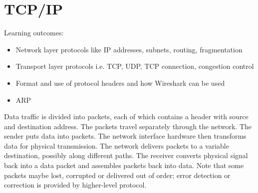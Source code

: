 \documentclass[twoside]{article}
\begin{document}
\section{TCP/IP}
Learning outcomes:
\begin{itemize}
    \item Network layer protocols like IP addresses, subnets, routing,
    fragmentation
    \item Transport layer protocols i.e. TCP, UDP, TCP connection, congestion
    control
    \item Format and use of protocol headers and how Wireshark can be used
    \item ARP
\end{itemize}
Data traffic is divided into packets, each of which contains a header with 
source and destination address. The packets travel separately through the 
network. The sender puts data into packets. The network interface hardware
then transforms data for physical transmission. The network delivers packets
to a variable destination, possibly along different paths. The receiver 
converts physical signal back into a data packet and assembles packets back
into data. Note that some packets maybe lost, corrupted or delivered out of 
order; error detection or correction is provided by higher-level protocol. \\
\end{document}
